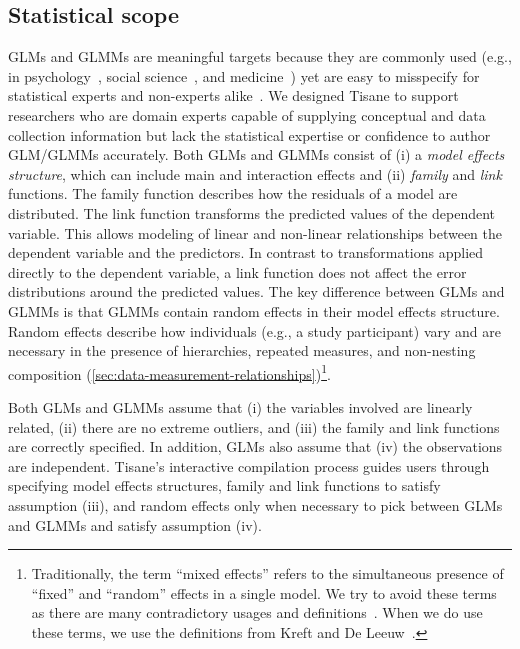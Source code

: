 \subsection{Statistical scope}  \label{sec:GLM}
GLMs and GLMMs are meaningful targets because they are commonly
used (e.g., in psychology~\cite{lo2015transform,cohen2013applied}, social
science~\cite{kreft1998introducing}, and
medicine~\cite{bolker2009generalized,barr2013random}) yet are easy to misspecify
for statistical experts and non-experts alike~\cite{barr2013random,
cohen2013applied}. We designed Tisane to support researchers who are domain
experts capable of supplying conceptual and data collection information but lack
the statistical expertise or confidence to author GLM/GLMMs accurately.
Both GLMs and GLMMs consist of (i) a \textit{model effects structure},
which can include main and interaction effects and (ii) \textit{family} and
\textit{link} functions. The family function describes how the residuals of a
model are distributed. The link function transforms the predicted values of the
dependent variable. This allows modeling of linear and non-linear relationships
between the dependent variable and the predictors. In contrast to
transformations applied directly to the dependent variable, a link function does
not affect the error distributions around the predicted values. The key
difference between GLMs and GLMMs is that GLMMs contain random effects in their
model effects structure. Random effects describe how individuals (e.g., a study
participant) vary and are necessary in the presence of hierarchies, repeated
measures, and non-nesting composition
(\ref{sec:data-measurement-relationships})\footnote{Traditionally, the term
``mixed effects'' refers to the simultaneous presence of ``fixed'' and
``random'' effects in a single model. We try to avoid these terms as there are
many contradictory usages and definitions~\cite{gelmanFixedRandom}. When we do
use these terms, we use the definitions from Kreft and De
Leeuw~\cite{kreft1998introducing}.}.

Both GLMs and GLMMs assume that (i) the variables involved are linearly related,
(ii) there are no extreme outliers, and (iii) the family and link functions are
correctly specified. In addition, GLMs also assume that (iv) the observations
are independent. Tisane's interactive compilation process guides users through
specifying model effects structures, family and link functions to satisfy
assumption (iii), and random effects only when necessary to pick between GLMs
and GLMMs and satisfy assumption (iv).

